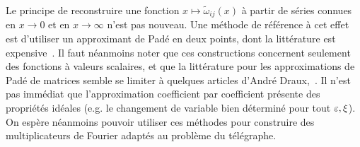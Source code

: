 Le principe de reconstruire une fonction $x \mapsto \widetilde{\omega}_{ij}(x)$ à partir de séries connues en $x \rightarrow 0$ et en $x \rightarrow \infty$ n'est pas nouveau. Une méthode de référence à cet effet est d'utiliser un approximant de Padé en deux points, dont la littérature est expensive~\cite{jones.1980.computation, jones.1983.two, baker.1996.pade, driscoll.2001.pade, tampos.2012.accurate}. Il faut néanmoins noter que ces constructions concernent seulement des fonctions à valeurs scalaires, et que la littérature pour les approximations de Padé de matrices semble se limiter à quelques articles d'André Draux,~\cite{draux.1984.pade,draux.1988.convergence}. Il n'est pas immédiat que l'approximation coefficient par coefficient présente des propriétés idéales (e.g. le changement de variable bien déterminé pour tout $\varepsilon,\xi$). On espère néanmoins pouvoir utiliser ces méthodes pour construire des multiplicateurs de Fourier adaptés au problème du télégraphe.


